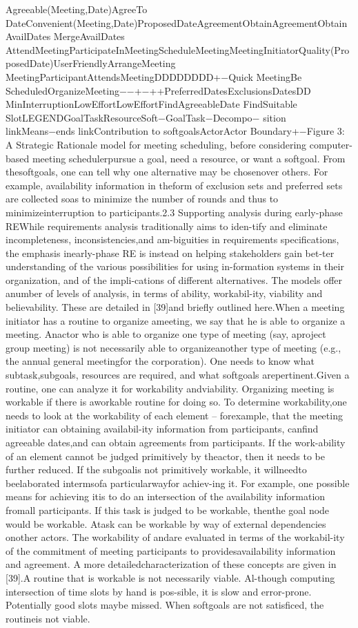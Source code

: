 Agreeable(Meeting,Date)AgreeTo DateConvenient(Meeting,Date)ProposedDateAgreementObtainAgreementObtainAvailDates   MergeAvailDates AttendMeetingParticipateInMeetingScheduleMeetingMeetingInitiatorQuality(ProposedDate)UserFriendlyArrangeMeeting MeetingParticipantAttendsMeetingDDDDDDDD+−Quick MeetingBe ScheduledOrganizeMeeting−−+−++PreferredDatesExclusionsDatesDD  MinInterruptionLowEffortLowEffortFindAgreeableDate  FindSuitable  SlotLEGENDGoalTaskResourceSoft−GoalTask−Decompo−   sition linkMeans−ends linkContribution to    softgoalsActorActor Boundary+−Figure 3: A Strategic Rationale model for meeting scheduling, before considering computer-based meeting schedulerpursue a goal, need a resource, or want a softgoal. From thesoftgoals, one can tell why one alternative may be chosenover others. For example, availability information in theform of exclusion sets and preferred sets are collected soas to minimize the number of rounds and thus to minimizeinterruption to participants.2.3 Supporting analysis during early-phase REWhile requirements analysis traditionally aims to iden-tify and eliminate incompleteness, inconsistencies,and am-biguities in requirements speciﬁcations, the emphasis inearly-phase RE is instead on helping stakeholders gain bet-ter understanding of the various possibilities for using in-formation systems in their organization, and of the impli-cations of different alternatives. The models offer anumber of levels of analysis, in terms of ability, workabil-ity, viability and believability. These are detailed in [39]and brieﬂy outlined here.When a meeting initiator has a routine to organize ameeting, we say that he is able to organize a meeting. Anactor who is able to organize one type of meeting (say, aproject group meeting) is not necessarily able to organizeanother type of meeting (e.g., the annual general meetingfor the corporation). One needs to know what subtask,subgoals, resources are required, and what softgoals arepertinent.Given a routine, one can analyze it for workability andviability. Organizing meeting is workable if there is aworkable routine for doing so. To determine workability,one needs to look at the workability of each element – forexample, that the meeting initiator can obtaining availabil-ity information from participants, canﬁnd agreeable dates,and can obtain agreements from participants. If the work-ability of an element cannot be judged primitively by theactor, then it needs to be further reduced. If the subgoalis not primitively workable, it willneedto beelaborated intermsofa particularwayfor achiev-ing it. For example, one possible means for achieving itis to do an intersection of the availability information fromall participants. If this task is judged to be workable, thenthe goal node would be workable. Atask can be workable by way of external dependencies onother actors. The workability of andare evaluated in terms of the workabil-ity of the commitment of meeting participants to providesavailability information and agreement. A more detailedcharacterization of these concepts are given in [39].A routine that is workable is not necessarily viable. Al-though computing intersection of time slots by hand is pos-sible, it is slow and error-prone. Potentially good slots maybe missed. When softgoals are not satisﬁced, the routineis not viable. 